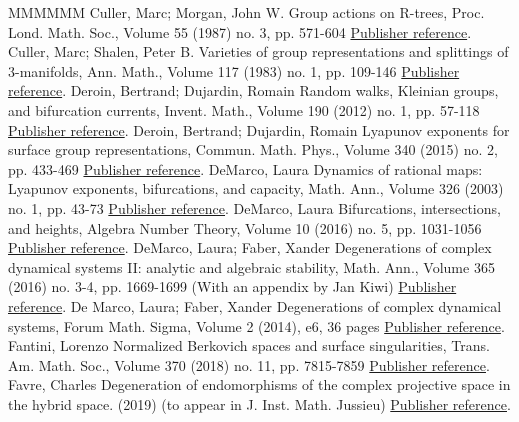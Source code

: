 \documentclass[11pt]{article}
\theoremstyle{definition}
\numberwithin{equation}{section}
\numberwithin{figure}{section}
\numberwithin{table}{section}
\begin{document}
\begin{thebibliography}{MMMMMM}
 Culler, Marc; Morgan, John W. Group actions on R-trees, Proc. Lond. Math. Soc., Volume 55 (1987) no. 3, pp. 571-604 \href{https://ahl.centre-mersenne.org/item/AHL_2019__2__515_0/#culler-morgan}{Publisher reference}.
 Culler, Marc; Shalen, Peter B. Varieties of group representations and splittings of 3-manifolds, Ann. Math., Volume 117 (1983) no. 1, pp. 109-146 \href{https://ahl.centre-mersenne.org/item/AHL_2019__2__515_0/#culler-shalen}{Publisher reference}.
 Deroin, Bertrand; Dujardin, Romain Random walks, Kleinian groups, and bifurcation currents, Invent. Math., Volume 190 (2012) no. 1, pp. 57-118 \href{https://ahl.centre-mersenne.org/item/AHL_2019__2__515_0/#kleinbif}{Publisher reference}.
 Deroin, Bertrand; Dujardin, Romain Lyapunov exponents for surface group representations, Commun. Math. Phys., Volume 340 (2015) no. 2, pp. 433-469 \href{https://ahl.centre-mersenne.org/item/AHL_2019__2__515_0/#bers1}{Publisher reference}.
 DeMarco, Laura Dynamics of rational maps: Lyapunov exponents, bifurcations, and capacity, Math. Ann., Volume 326 (2003) no. 1, pp. 43-73 \href{https://ahl.centre-mersenne.org/item/AHL_2019__2__515_0/#demarco03}{Publisher reference}.
 DeMarco, Laura Bifurcations, intersections, and heights, Algebra Number Theory, Volume 10 (2016) no. 5, pp. 1031-1056 \href{https://ahl.centre-mersenne.org/item/AHL_2019__2__515_0/#demarco16}{Publisher reference}.
 DeMarco, Laura; Faber, Xander Degenerations of complex dynamical systems II: analytic and algebraic stability, Math. Ann., Volume 365 (2016) no. 3-4, pp. 1669-1699 (With an appendix by Jan Kiwi) \href{https://ahl.centre-mersenne.org/item/AHL_2019__2__515_0/#demarco-faber-2}{Publisher reference}.
 De Marco, Laura; Faber, Xander Degenerations of complex dynamical systems, Forum Math. Sigma, Volume 2 (2014), e6, 36 pages \href{https://ahl.centre-mersenne.org/item/AHL_2019__2__515_0/#demarco-faber}{Publisher reference}.
 Fantini, Lorenzo Normalized Berkovich spaces and surface singularities, Trans. Am. Math. Soc., Volume 370 (2018) no. 11, pp. 7815-7859 \href{https://ahl.centre-mersenne.org/item/AHL_2019__2__515_0/#NL}{Publisher reference}.
 Favre, Charles Degeneration of endomorphisms of the complex projective space in the hybrid space. (2019) (to appear in J. Inst. Math. Jussieu) \href{https://ahl.centre-mersenne.org/item/AHL_2019__2__515_0/#degeneration}{Publisher reference}.

\end{thebibliography}
\end{document}

